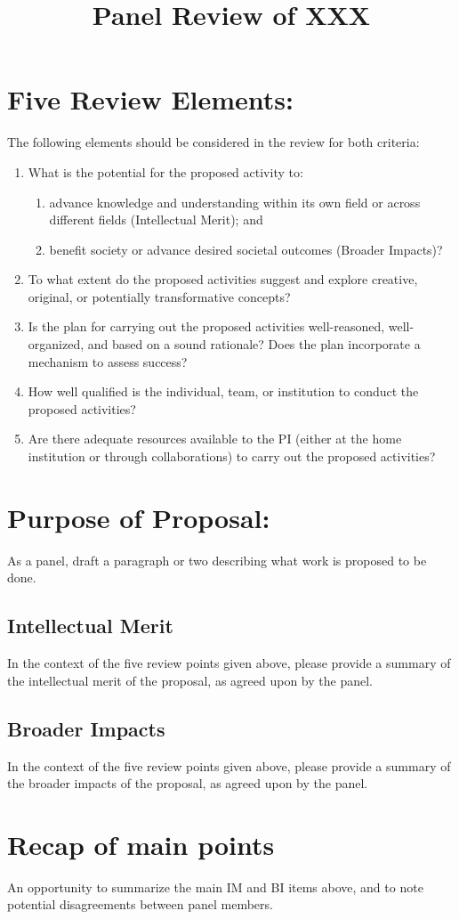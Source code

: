\documentclass{article}
\title{Panel Review of XXX}
\begin{document}
\maketitle
\section*{Five Review Elements:}
The following elements should be considered in the review for both criteria:
\begin{enumerate}
\item What is the potential for the proposed activity to:
  \begin{enumerate}
   \item advance knowledge and understanding within its own field or across different fields (Intellectual Merit); and
   \item benefit society or advance desired societal outcomes (Broader Impacts)?
  \end{enumerate}
\item To what extent do the proposed activities suggest and explore creative, original, or potentially transformative concepts?
\item Is the plan for carrying out the proposed activities well-reasoned, well- organized, and based on a sound rationale? Does the plan incorporate a mechanism to assess success?
\item How well qualified is the individual, team, or institution to conduct the proposed activities?
\item Are there adequate resources available to the PI (either at the home institution or through collaborations) to carry out the proposed activities?
\end{enumerate}

\section*{Purpose of Proposal:}
As a panel, draft a paragraph or two describing what work is proposed to be done.

\subsection*{Intellectual Merit}
In the context of the five review points given above, please provide a summary of the intellectual merit of the proposal, as agreed upon by the panel.

\subsection*{Broader Impacts}
In the context of the five review points given above, please provide a summary of the broader impacts of the proposal, as agreed upon by the panel.

\section*{Recap of main points}
An opportunity to summarize the main IM and BI items above, and to note potential disagreements between panel members.
\end{document}
